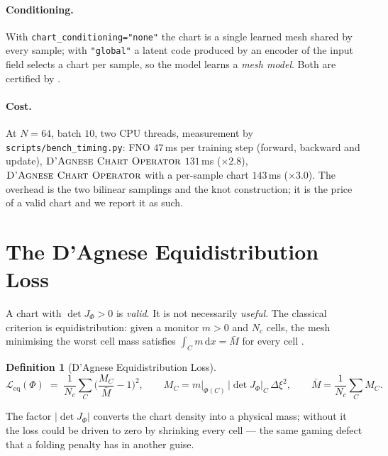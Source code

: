 \documentclass[11pt,a4paper]{article}
\theoremstyle{plain}
\theoremstyle{definition}
\newtheorem{definition}[theorem]{Definition}
\newcommand{\dd}{\,\mathrm{d}}
\newcommand{\detJ}{\det J_\Phi}
\newcommand{\Leq}{\mathcal{L}_{\mathrm{eq}}}
\newcommand{\DAO}{\textsc{D'Agnese Chart Operator}}
\newcommand{\code}[1]{\texttt{#1}}
\begin{document}
\paragraph{Conditioning.}  With \code{chart\_conditioning="none"} the chart is a
single learned mesh shared by every sample; with \code{"global"} a latent code
produced by an encoder of the input field selects a chart per sample, so the
model learns a \emph{mesh model}.  Both are certified by .

\paragraph{Cost.}  At $N=64$, batch $10$, two CPU threads, measurement by
\code{scripts/bench\_timing.py}: FNO $47$\,ms per training step (forward,
backward and update), $\DAO$ $131$\,ms ($\times2.8$), $\DAO$ with a per-sample
chart $143$\,ms ($\times3.0$).  The overhead is the two bilinear samplings and
the knot construction; it is the price of a valid chart and we report it as
such.

\section{The D'Agnese Equidistribution Loss}
\label{sec:loss}

A chart with $\detJ>0$ is \emph{valid}.  It is not necessarily \emph{useful}.
The classical criterion is equidistribution: given a monitor $m>0$ and $N_c$
cells, the mesh minimising the worst cell mass satisfies
$\int_C m\dd x=\bar M$ for every cell \cite{deboor1973good,huang2011moving}.

\begin{definition}[D'Agnese Equidistribution Loss]
\label{def:eq}
\begin{equation}
  \Leq(\Phi)\;=\;\frac{1}{N_c}\sum_{C}\Big(\frac{M_C}{\bar M}-1\Big)^{2},
  \qquad
  M_C = m\big|_{\Phi(C)}\,\big|\detJ\big|_{C}\,\Delta\xi^{2},
  \qquad
  \bar M=\frac{1}{N_c}\sum_C M_C .
\end{equation}
\end{definition}

The factor $|\detJ|$ converts the chart density into a physical mass; without it
the loss could be driven to zero by shrinking every cell — the same
gaming defect that a folding penalty has in another guise.
\end{document}

